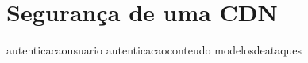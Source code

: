 \section{Seguran\c{c}a de uma CDN} \label{sec:seguranca}

{autenticacaousuario}
{autenticacaoconteudo}
{modelosdeataques}